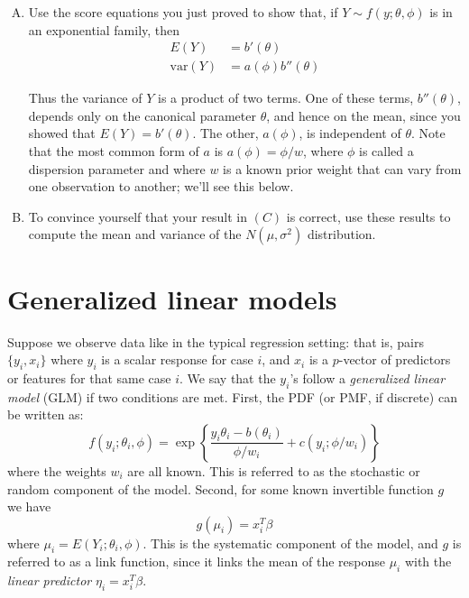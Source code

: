 \documentclass[11pt]{article}
\begin{document}
\begin{enumerate}[(A)]
\item Use the score equations you just proved to show that, if $Y \sim f(y; \theta, \phi)$ is in an exponential family, then
$$
\begin{aligned}
E(Y) &=  b'(\theta) \\
\mbox{var} ( Y ) &= a(\phi) b''(\theta) 
\end{aligned}
$$

Thus the variance of $Y$ is a product of two terms.  One of these terms, $b''(\theta)$, depends only on the canonical parameter $\theta$, and hence on the mean, since you showed that $E(Y) =  b'(\theta)$.  The other, $a(\phi)$, is independent of $\theta$.  Note that the most common form of $a$ is $a(\phi) = \phi/w$, where $\phi$ is called a dispersion parameter and where $w$ is a known prior weight that can vary from one observation to another; we'll see this below.  

\item To convince yourself that your result in $(C)$ is correct, use these results to compute the mean and variance of the $N(\mu, \sigma^2)$ distribution.  

\end{enumerate}


\section{Generalized linear models}  

Suppose we observe data like in the typical regression setting: that is, pairs $\{y_i, x_i\}$ where $y_i$ is a scalar response for case $i$, and $x_i$ is a $p$-vector of predictors or features for that same case $i$.  We say that the $y_i$'s follow a \textit{generalized linear model} (GLM) if two conditions are met.  First, the PDF (or PMF, if discrete) can be written as:  
$$
f(y_i; \theta_i,  \phi)  = \exp \left\{ \frac{y_i \theta_i - b(\theta_i)}{\phi/w_i} + c(y_i; \phi/w_i)   \right \}
$$
where the weights $w_i$ are all known.  This is referred to as the stochastic or random component of the model.  Second, for some known invertible function $g$ we have
$$
g(\mu_i) = x_i^T \beta
$$
where $\mu_i = E(Y_i; \theta_i, \phi)$.  This is the systematic component of the model, and $g$ is referred to as a link function, since it links the mean of the response $\mu_i$ with the \emph{linear predictor} $\eta_i = x_i^T \beta$.  
\end{document}
